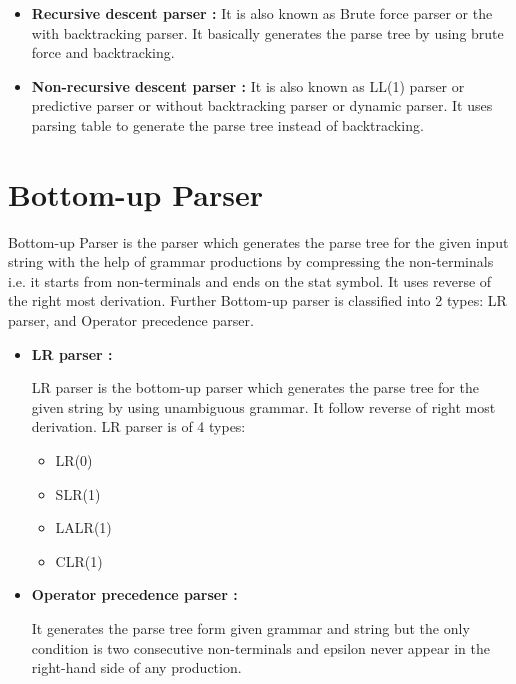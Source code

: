 \documentclass[12pt]{article}
\begin{document}
\begin{itemize}
	\item \textbf{Recursive descent parser :} It is also known as Brute force parser or the with backtracking parser. It basically generates the parse tree by using brute force and backtracking.
	\item \textbf{Non-recursive descent parser :} It is also known as LL(1) parser or predictive parser or without backtracking parser or dynamic parser. It uses parsing table to generate the parse tree instead of backtracking.
\end{itemize}



\section{Bottom-up Parser}

Bottom-up Parser is the parser which generates the parse tree for the given input string with the help of grammar productions by compressing the non-terminals i.e. it starts from non-terminals and ends on the stat symbol. It uses reverse of the right most derivation.
Further Bottom-up parser is classified into 2 types: LR parser, and Operator precedence parser.

\begin{itemize}
	\item \textbf{LR parser : }
	
	LR parser is the bottom-up parser which generates the parse tree for the given string by using unambiguous grammar. It follow reverse of right most derivation.
LR parser is of 4 types: 
	\begin{itemize}
		\item LR(0)
		\item SLR(1)
		\item LALR(1)
		\item CLR(1) 
	\end{itemize}
	\item \textbf{Operator precedence parser : }
	
	It generates the parse tree form given grammar and string but the only condition is two consecutive non-terminals and epsilon never appear in the right-hand side of any production.
\end{itemize}
\end{document}
